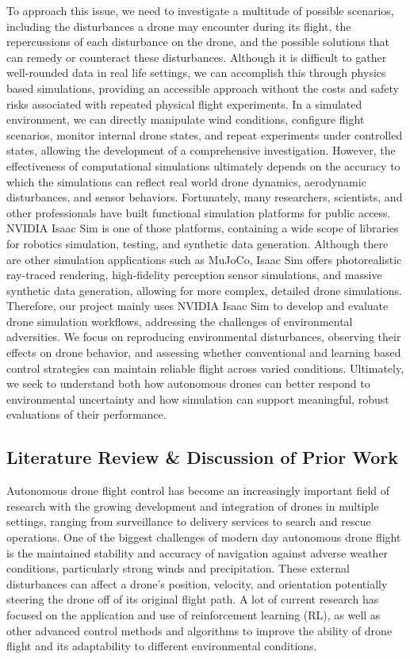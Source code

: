 \documentclass[12pt,letterpaper]{article}
\begin{document}
To approach this issue, we need to investigate a multitude of possible scenarios, including the disturbances a drone may encounter during its flight, the repercussions of each disturbance on the drone, and the possible solutions that can remedy or counteract these disturbances. Although it is difficult to gather well-rounded data in real life settings, we can accomplish this through physics based simulations, providing an accessible approach without the costs and safety risks associated with repeated physical flight experiments. In a simulated environment, we can directly manipulate wind conditions, configure flight scenarios, monitor internal drone states, and repeat experiments under controlled states, allowing the development of a comprehensive investigation. However, the effectiveness of computational simulations ultimately depends on the accuracy to which the simulations can reflect real world drone dynamics, aerodynamic disturbances, and sensor behaviors. Fortunately, many researchers, scientists, and other professionals have built functional simulation platforms for public access. NVIDIA Isaac Sim is one of those platforms, containing a wide scope of libraries for robotics simulation, testing, and synthetic data generation. Although there are other simulation applications such as MuJoCo, Isaac Sim offers photorealistic ray-traced rendering, high-fidelity perception sensor simulations, and massive synthetic data generation, allowing for more complex, detailed drone simulations. Therefore, our project mainly uses NVIDIA Isaac Sim to develop and evaluate drone simulation workflows, addressing the challenges of environmental adversities. We focus on reproducing environmental disturbances, observing their effects on drone behavior, and assessing whether conventional and learning based control strategies can maintain reliable flight across varied conditions. Ultimately, we seek to understand both how autonomous drones can better respond to environmental uncertainty and how simulation can support meaningful, robust evaluations of their performance.


\subsection{Literature Review \& Discussion of Prior Work}

Autonomous drone flight control has become an increasingly important field of research with the growing development and integration of drones in multiple settings, ranging from surveillance to delivery services to search and rescue operations. One of the biggest challenges of modern day autonomous drone flight is the maintained stability and accuracy of navigation against adverse weather conditions, particularly strong winds and precipitation. These external disturbances can affect a drone’s position, velocity, and orientation potentially steering the drone off of its original flight path. A lot of current research has focused on the application and use of reinforcement learning (RL), as well as other advanced control methods and algorithms to improve the ability of drone flight and its adaptability to different environmental conditions.
\end{document}
